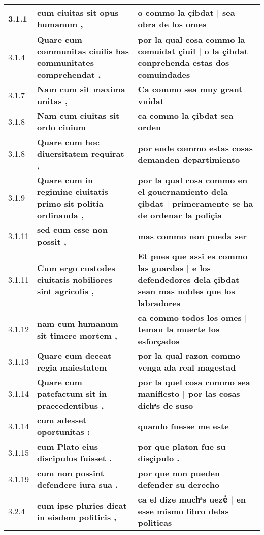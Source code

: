 \begin{tabular}{|p{1cm}|p{6.5cm}|p{6.5cm}|}
3.1.1 &  \textbf{ cum ciuitas sit opus humanum , }  &  \textbf{ o commo la çibdat | sea obra de los omes }  \\\hline
3.1.4 &  \textbf{ Quare cum communitas ciuilis has communitates comprehendat , }  &  \textbf{ por la qual cosa commo la comuidat çiuil | o la çibdat conprehenda estas dos comuindades }  \\\hline
3.1.7 &  \textbf{ Nam cum sit maxima unitas , }  &  \textbf{ Ca commo sea muy grant vnidat }  \\\hline
3.1.8 &  \textbf{ Nam cum ciuitas sit ordo ciuium }  &  \textbf{ ca commo la çibdat sea orden }  \\\hline
3.1.8 &  \textbf{ Quare cum hoc diuersitatem requirat , }  &  \textbf{ por ende commo estas cosas demanden departimiento }  \\\hline
3.1.9 &  \textbf{ Quare cum in regimine ciuitatis primo sit politia ordinanda , }  &  \textbf{ por la qual cosa commo en el gouernamiento dela çibdat | primeramente se ha de ordenar la poliçia }  \\\hline
3.1.11 &  \textbf{ sed cum esse non possit , }  &  \textbf{ mas commo non pueda ser }  \\\hline
3.1.11 &  \textbf{ Cum ergo custodes ciuitatis nobiliores sint agricolis , }  &  \textbf{ Et pues que assi es commo las guardas | e los defendedores dela çibdat sean mas nobles que los labradores }  \\\hline
3.1.12 &  \textbf{ nam cum humanum sit timere mortem , }  &  \textbf{ ca commo todos los omes | teman la muerte los esforçados }  \\\hline
3.1.13 &  \textbf{ Quare cum deceat regia maiestatem }  &  \textbf{ por la qual razon commo venga ala real magestad }  \\\hline
3.1.14 &  \textbf{ Quare cum patefactum sit in praecedentibus , }  &  \textbf{ por la quel cosa commo sea manifiesto | por las cosas dichͣs de suso }  \\\hline
3.1.14 &  \textbf{ cum adesset oportunitas : }  &  \textbf{ quando fuesse me este }  \\\hline
3.1.15 &  \textbf{ cum Plato eius discipulus fuisset . }  &  \textbf{ por que platon fue su disçipulo . }  \\\hline
3.1.19 &  \textbf{ cum non possint defendere iura sua . }  &  \textbf{ por que non pueden defender su derecho }  \\\hline
3.2.4 &  \textbf{ cum ipse pluries dicat in eisdem politicis , }  &  \textbf{ ca el dize muchͣs uezeᷤ | en esse mismo libro delas politicas }  \\\hline

\end{tabular}
